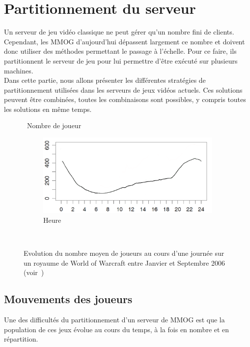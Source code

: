 \section{Partitionnement du serveur}
Un serveur de jeu vidéo classique ne peut gérer qu'un nombre fini de clients. Cependant, les MMOG d'aujourd'hui dépassent largement ce nombre et doivent donc utiliser des méthodes permettant le passage à l'échelle. Pour ce faire, ils partitionnent le serveur de jeu pour lui permettre d'être exécuté sur plusieurs machines.\\

Dans cette partie, nous allons présenter les différentes stratégies de partitionnement utilisées dans les serveurs de jeux vidéos actuels. Ces solutions peuvent être combinées, toutes les combinaisons sont possibles, y compris toutes les solutions en même temps.

\begin{figure}[b!]
	\centering
	\begin{sideways}\qquad\quad~Nombre de joueur\end{sideways}
	\begin{subfigure}[b]{0.5\textwidth}
		\centering
		\includegraphics[width=\textwidth]{player_day_evol.png}\\
		Heure
	\end{subfigure}
	\\[0.2cm]
	\caption{Evolution du nombre moyen de joueurs au cours d'une journée sur un royaume de World of Warcraft entre Janvier et Septembre 2006 (voir~\cite{is_server_consolidation_benefical})}
	\label{fig:player_day_evol}
\end{figure}

\subsection{Mouvements des joueurs}
Une des difficultés du partitionnement d'un serveur de MMOG est que la population de ces jeux évolue au cours du temps, à la fois en nombre et en répartition.\\

